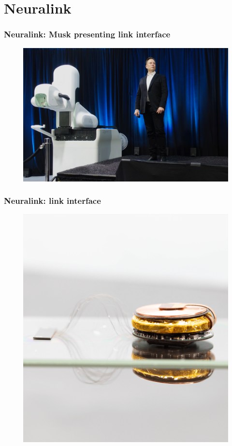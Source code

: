 \documentclass[12pt, aspectratio=169]{beamer}
\begin{document}
\section{Neuralink}

\begin{frame}
  \frametitle{Neuralink: Musk presenting link interface}
  \begin{figure}
    \includegraphics[width=0.6\linewidth]{Elon_Musk_and_the_Neuralink_Future}
  \end{figure}
\end{frame}
\begin{frame}
  \frametitle{Neuralink: link interface}
  \begin{figure}
    \includegraphics[width=0.4\linewidth]{approach-link-1}
  \end{figure}
\end{frame}



\end{document}
